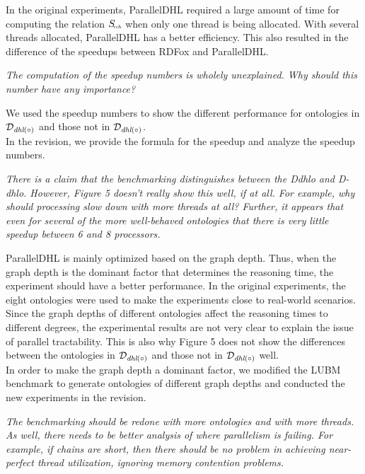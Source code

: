 \documentclass{article}
\let\quoteOld\quote
\let\endquoteOld\endquote
\renewenvironment{quote}{\quoteOld\itshape}{\endquoteOld}
\begin{document}
In the original experiments, ParallelDHL required a large amount of time for computing
the relation $S_{\textit{\!\tiny rch}}$ when only one thread is being allocated.
With several threads allocated, ParallelDHL has a better efficiency.
This also resulted in the difference of the speedups between RDFox and ParallelDHL.


\begin{quote}
The computation of the speedup numbers is wholely unexplained.  Why should
this number have any importance?
\end{quote}


We used the speedup numbers to show the different performance for
ontologies in $\mathcal{D}_{\textit{\text{dhl}}(\circ)}$ and those
 not in $\mathcal{D}_{\textit{\text{dhl}}(\circ)}$.\\

In the revision, we provide the formula for the speedup and analyze
the speedup numbers.


\begin{quote}
There is a claim that the benchmarking distinguishes between the Ddhlo and
D-dhlo.  However, Figure 5 doesn't really show this well, if at all.   For
example, why should processing slow down with more threads at all?  Further,
it appears that even for several of the more well-behaved ontologies that there
is very little speedup between 6 and 8 processors.
\end{quote}


ParallelDHL is mainly
optimized based on the graph depth. Thus, when the graph depth is the
dominant factor that determines the reasoning time, the experiment 
should have a better performance. 
In the original experiments, the eight ontologies were used to make
the experiments close to real-world scenarios.
Since the graph depths of different ontologies affect the reasoning times
to different degrees, the experimental results are not very clear
to explain the issue of parallel tractability.
This is also why
Figure 5 does not show the differences between the ontologies in
$\mathcal{D}_{\textit{\text{dhl}}(\circ)}$ and those not in
$\mathcal{D}_{\textit{\text{dhl}}(\circ)}$ well.\\

In order to make the graph depth a dominant factor, we modified the LUBM benchmark to 
generate ontologies of different graph depths and conducted the new experiments
in the revision.



\begin{quote}
The benchmarking should be redone with more ontologies and with more
threads.  As well, there needs to be better analysis of where parallelism is
failing.  For example, if chains are short, then there should be no problem
in achieving near-perfect thread utilization, ignoring memory contention
problems.
\end{quote}
\end{document}
